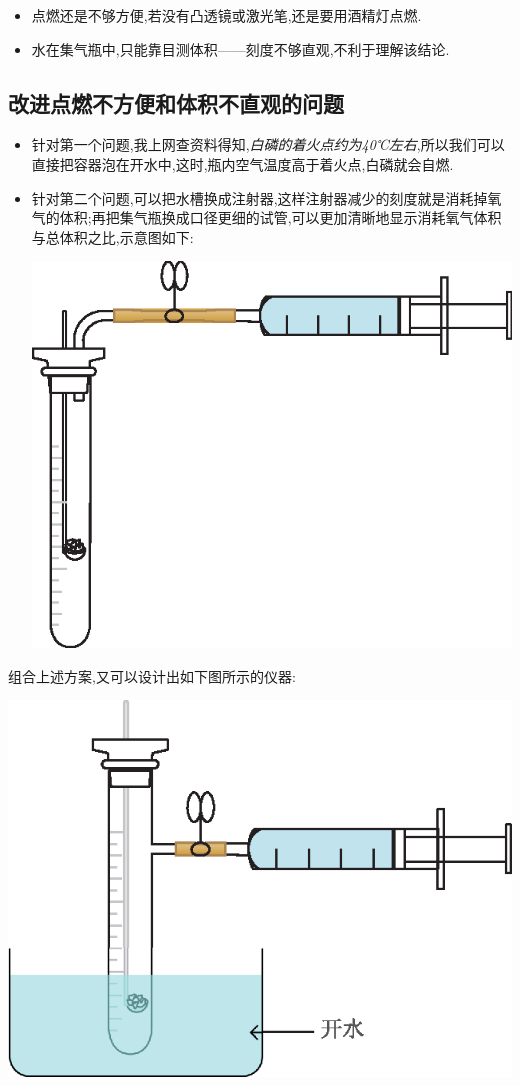 \documentclass[11pt,a4paper,titlepage,twocolumn]{ctexart}
\begin{document}
	\begin{itemize}
		\item 点燃还是不够方便,若没有凸透镜或激光笔,还是要用酒精灯点燃.
		\item 水在集气瓶中,只能靠目测体积——刻度不够直观,不利于理解该结论.
	\end{itemize}
	
	\subsection{改进点燃不方便和体积不直观的问题}
	
	\begin{itemize}
		\item 针对第一个问题,我上网查资料得知,\textit{白磷的着火点约为40℃左右},所以我们可以直接把容器泡在开水中,这时,瓶内空气温度高于着火点,白磷就会自燃.
		\item 针对第二个问题,可以把水槽换成注射器,这样注射器减少的刻度就是消耗掉氧气的体积;再把集气瓶换成口径更细的试管,可以更加清晰地显示消耗氧气体积与总体积之比,示意图如下:\\
		\begin{center}
			\includegraphics[width=0.8\linewidth]{fig/4}
		\end{center}
	\end{itemize}
		
	组合上述方案,又可以设计出如下图所示的仪器:
		
	\begin{center}
		\includegraphics[width=0.8\linewidth]{fig/5}
	\end{center}
		
\end{document}
